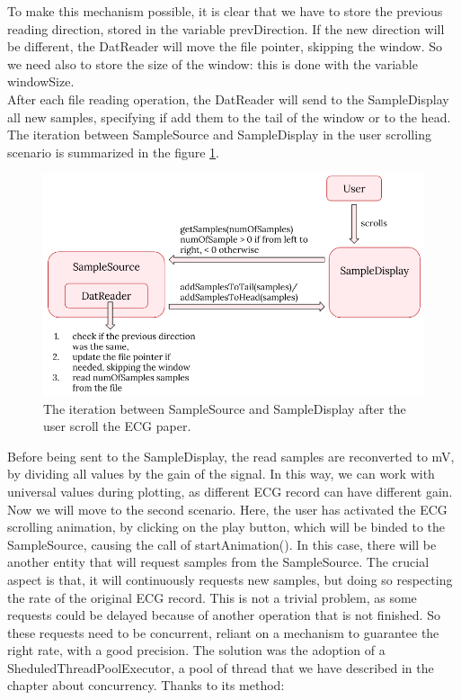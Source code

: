 To make this mechanism possible, it is clear that we have to store the previous reading direction, stored in the variable prevDirection. If the new direction will be different, the DatReader will move the file pointer, skipping the window. So we need also to store the size of the window: this is done with the variable windowSize.\\
After each file reading operation, the DatReader will send to the SampleDisplay all new samples, specifying if add them to the tail of the window or to the head. The iteration between  SampleSource and SampleDisplay in the user scrolling scenario is summarized in the figure \ref{fig9.3}.
\begin{figure}[ht!]
	\centering
	\includegraphics[width=120mm]{figures/ch9/3.png}
	\caption{The iteration between  SampleSource and SampleDisplay after the user scroll the ECG paper.}
	\label{fig9.3}
\end{figure}
Before being sent to the SampleDisplay, the read samples are reconverted to mV, by dividing all values by the gain of the signal. In this way, we can work with universal values during plotting, as different ECG record can have different gain.\\
Now we will move to the second scenario. Here, the user has activated the ECG scrolling animation, by clicking on the play button, which will be binded to the SampleSource, causing the call of startAnimation(). In this case, there will be another entity that will request samples from the SampleSource. The crucial aspect is that, it will continuously requests new samples, but doing so respecting the rate of the original ECG record. This is not a trivial problem, as some requests could be delayed because of another operation that is not finished. So these requests need to be concurrent, reliant on a mechanism to guarantee the right rate, with a good precision. The solution was the adoption of a SheduledThreadPoolExecutor, a pool of thread that we have described in the chapter about concurrency. Thanks to its method:
